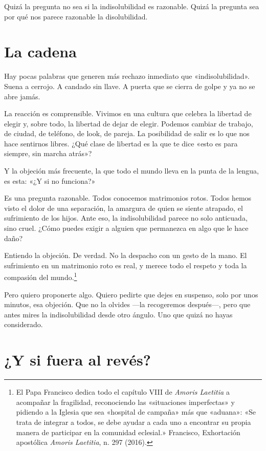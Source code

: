 Quizá la pregunta no sea si la indisolubilidad es razonable. Quizá la pregunta sea por qué nos parece razonable la disolubilidad.

\section{La cadena}

Hay pocas palabras que generen más rechazo inmediato que «indisolubilidad». Suena a cerrojo. A candado sin llave. A puerta que se cierra de golpe y ya no se abre jamás.

La reacción es comprensible. Vivimos en una cultura que celebra la libertad de elegir y, sobre todo, la libertad de dejar de elegir. Podemos cambiar de trabajo, de ciudad, de teléfono, de look, de pareja. La posibilidad de salir es lo que nos hace sentirnos libres. ¿Qué clase de libertad es la que te dice «esto es para siempre, sin marcha atrás»?

Y la objeción más frecuente, la que todo el mundo lleva en la punta de la lengua, es esta: «¿Y si no funciona?»

Es una pregunta razonable. Todos conocemos matrimonios rotos. Todos hemos visto el dolor de una separación, la amargura de quien se siente atrapado, el sufrimiento de los hijos. Ante eso, la indisolubilidad parece no solo anticuada, sino cruel. ¿Cómo puedes exigir a alguien que permanezca en algo que le hace daño?

Entiendo la objeción. De verdad. No la despacho con un gesto de la mano. El sufrimiento en un matrimonio roto es real, y merece todo el respeto y toda la compasión del mundo.\footnote{El Papa Francisco dedica todo el capítulo VIII de \textit{Amoris Laetitia} a acompañar la fragilidad, reconociendo las «situaciones imperfectas» y pidiendo a la Iglesia que sea «hospital de campaña» más que «aduana»: «Se trata de integrar a todos, se debe ayudar a cada uno a encontrar su propia manera de participar en la comunidad eclesial.» Francisco, Exhortación apostólica \textit{Amoris Laetitia}, n. 297 (2016).}

Pero quiero proponerte algo. Quiero pedirte que dejes en suspenso, solo por unos minutos, esa objeción. Que no la olvides ---la recogeremos después---, pero que antes mires la indisolubilidad desde otro ángulo. Uno que quizá no hayas considerado.

\section{¿Y si fuera al revés?}

